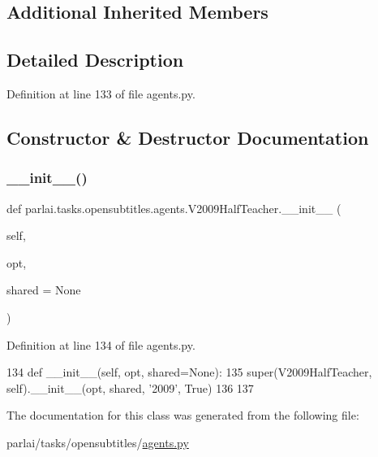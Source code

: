 \subsection*{Additional Inherited Members}


\subsection{Detailed Description}


Definition at line 133 of file agents.\+py.



\subsection{Constructor \& Destructor Documentation}
\mbox{\label{classparlai_1_1tasks_1_1opensubtitles_1_1agents_1_1V2009HalfTeacher_a9bc739825e9990d471efa003e92e52d4}} 
\subsubsection{\texorpdfstring{\+\_\+\+\_\+init\+\_\+\+\_\+()}{\_\_init\_\_()}}
{\footnotesize\ttfamily def parlai.\+tasks.\+opensubtitles.\+agents.\+V2009\+Half\+Teacher.\+\_\+\+\_\+init\+\_\+\+\_\+ (\begin{DoxyParamCaption}\item[{}]{self,  }\item[{}]{opt,  }\item[{}]{shared = {\ttfamily None} }\end{DoxyParamCaption})}



Definition at line 134 of file agents.\+py.


\begin{DoxyCode}
134     \textcolor{keyword}{def }\_\_init\_\_(self, opt, shared=None):
135         super(V2009HalfTeacher, self).\_\_init\_\_(opt, shared, \textcolor{stringliteral}{'2009'}, \textcolor{keyword}{True})
136 
137 
\end{DoxyCode}


The documentation for this class was generated from the following file\+:\begin{DoxyCompactItemize}
\item 
parlai/tasks/opensubtitles/\hyperlink{parlai_2tasks_2opensubtitles_2agents_8py}{agents.\+py}\end{DoxyCompactItemize}
